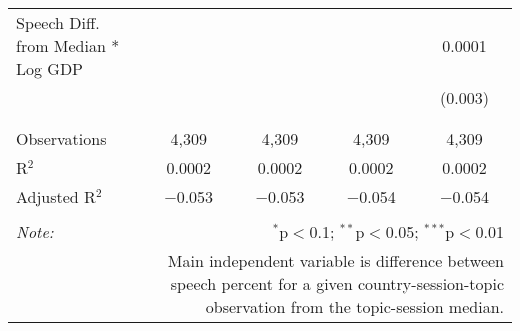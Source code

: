 \begin{table}[!htbp]
\begin{tabular}{@{\extracolsep{5pt}}lcccc}
 Speech Diff. from Median * Log GDP &  &  &  & 0.0001 \\ 
  &  &  &  & (0.003) \\ 
  & & & & \\ 
\hline \\[-1.8ex] 
Observations & 4,309 & 4,309 & 4,309 & 4,309 \\ 
R$^{2}$ & 0.0002 & 0.0002 & 0.0002 & 0.0002 \\ 
Adjusted R$^{2}$ & $-$0.053 & $-$0.053 & $-$0.054 & $-$0.054 \\ 
\hline 
\hline \\[-1.8ex] 
\textit{Note:}  & \multicolumn{4}{r}{$^{*}$p$<$0.1; $^{**}$p$<$0.05; $^{***}$p$<$0.01} \\ 
 & \multicolumn{4}{r}{Main independent variable is difference between speech percent for a given country-session-topic observation from the topic-session median.} \\ 
\end{tabular} 
\end{table} 
